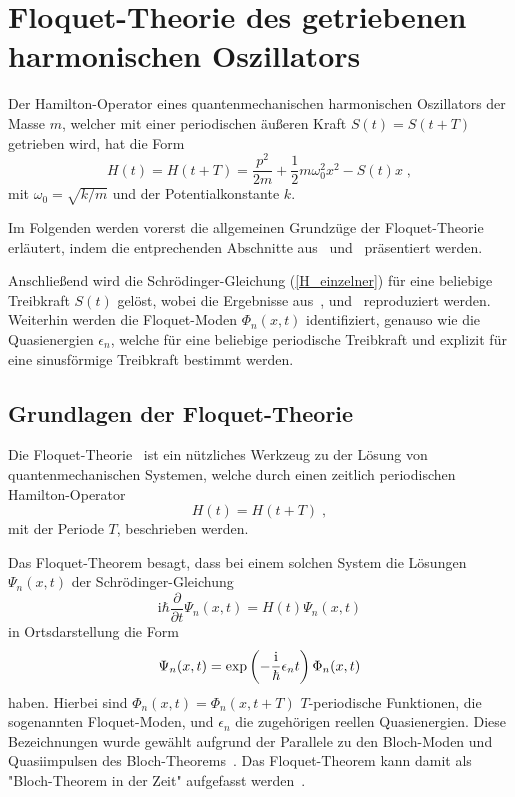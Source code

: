 \chapter{Floquet-Theorie des getriebenen harmonischen Oszillators}
\label{2}
Der Hamilton-Operator eines quantenmechanischen harmonischen Oszillators der Masse $m$, welcher mit einer periodischen äußeren Kraft $S(t)=S(t+T)$ getrieben wird, hat die Form
\begin{equation}
  H(t) = H(t+T) = \frac{p^2}{2m} + \frac{1}{2}m\omega_0^2x^2-S(t)x \; ,
  \label{H_einzelner}
\end{equation}
mit $\omega_0=\sqrt{k/m}$ und der Potentialkonstante $k$.

Im Folgenden werden vorerst die allgemeinen Grundzüge der Floquet-Theorie erläutert, indem die entprechenden Abschnitte aus~\cite{haengi} und~\cite{sherly} präsentiert werden.

Anschließend wird die Schrödinger-Gleichung (\ref{H_einzelner}) für eine beliebige Treibkraft $S(t)$ gelöst, wobei die Ergebnisse aus~\cite{haengi},\cite{husimi} und~\cite{mads} reproduziert werden.
Weiterhin werden die Floquet-Moden $\Phi_n(x,t)$ identifiziert, genauso wie die Quasienergien $\epsilon_n$, welche für eine beliebige periodische Treibkraft und explizit für eine sinusförmige Treibkraft bestimmt werden.
\iffalse
Danach werden wir die Ewartungswerte $\braket{x}_n,\braket{x^2}_n,\braket{p}_n,\braket{p^2}_n$ und damit die Unschärfe berechnen, indem wir die bekannten Erwartungswerte des ungetriebenen Oszillators benutzen.
Ebenso werden wir den zeitabhängigen und gemittelten Erwartungswert der Energie $\braket{H}_n$ und $\overline{H}_n$ berechnen.
\fi

\section{Grundlagen der Floquet-Theorie}
  Die Floquet-Theorie~\cite{haengi} ist ein nützliches Werkzeug zu der Lösung von quantenmechanischen Systemen, welche durch einen zeitlich periodischen Hamilton-Operator
  \begin{equation}
    H(t) = H(t+T) \; ,
  \end{equation}
  mit der Periode $T$, beschrieben werden.

  Das Floquet-Theorem besagt, dass bei einem solchen System die Lösungen $\Psi_n(x,t)$ der Schrödinger-Gleichung
  \begin{equation}
    \text{i}\hbar\frac{\partial}{\partial t}\Psi_n(x,t) = H(t)\Psi_n(x,t)
    \label{schroedinger}
  \end{equation}
  in Ortsdarstellung die Form
  \begin{equation}
    \Psi_n(x,t) = \exp\left(-\frac{\text i}{\hbar}\epsilon_nt\right)\Phi_n(x,t)
    \label{floquet_theorem}
  \end{equation}
  haben.
  Hierbei sind $\Phi_n(x,t) = \Phi_n(x,t+T)$ $T$-periodische Funktionen, die sogenannten Floquet-Moden, und $\epsilon_n$ die zugehörigen reellen Quasienergien.
  Diese Bezeichnungen wurde gewählt aufgrund der Parallele zu den Bloch-Moden und Quasiimpulsen des Bloch-Theorems~\cite{haengi}.
  Das Floquet-Theorem kann damit als "Bloch-Theorem in der Zeit" aufgefasst werden~\cite{sherly}.


